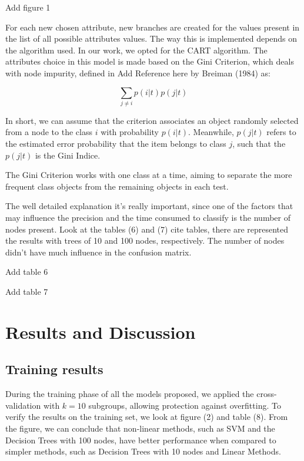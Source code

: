 \documentclass[conference]{IEEEtran}
\newcommand{\reviewUrgent}[1]{{\color{red} #1}} %
\newcommand{\reviewNormal}[1]{{\color{yellow} #1}} %
\begin{document}
\reviewUrgent{Add figure 1}

For each new chosen attribute, new branches are created for the values present in the list
of all possible attributes values. The way this is implemented depends on the algorithm
used. In our work, we opted for the CART algorithm. The attributes choice in this model
is made based on the Gini Criterion, which deals with node impurity, defined in \reviewUrgent{Add Reference here}
by Breiman (1984) as:

\begin{equation}
    \sum_{j \neq i} p(i|t)p(j|t) \label{eq20}
\end{equation}

In short, we can assume that the criterion associates an object randomly selected from a 
node to the class $i$ with probability $p(i|t)$. Meanwhile, $p(j|t)$ refers to the 
estimated error probability that the item belongs to class $j$, such that the $p(j|t)$
is the Gini Indice.

The Gini Criterion works with one class at a time, aiming to separate the more frequent 
class objects from the remaining objects in each test. 

The well detailed explanation it's really important, since one of the factors that may 
influence the precision and the time consumed to classify is the number of nodes present.
Look at the tables (6) and (7) \reviewNormal{cite tables}, there are represented the results
with trees of 10 and 100 nodes, respectively. The number of nodes didn't have much influence
in the confusion matrix.

\reviewUrgent{Add table 6}

\reviewUrgent{Add table 7}

\section{Results and Discussion}

\subsection{Training results}

During the training phase of all the models proposed, we applied the cross-validation 
with $k=10$ subgroups, allowing protection against overfitting. To verify the results
on the training set, we look at figure (2) and table (8). From the figure, we can 
conclude that non-linear methods, such as SVM and the Decision Trees with 100 nodes, 
have better performance when compared to simpler methods, such as Decision Trees with 10 
nodes and Linear Methods.
\end{document}
